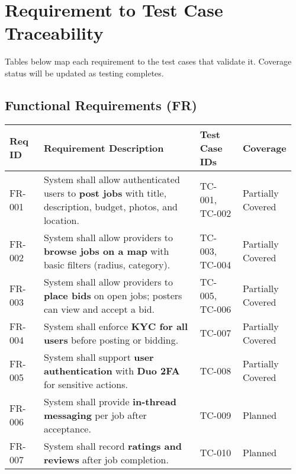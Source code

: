\documentclass[11pt]{article}
\begin{document}
\section{Requirement to Test Case Traceability}
Tables below map each requirement to the test cases that validate it. Coverage status will be updated as testing completes.

\subsection*{Functional Requirements (FR)}
\begin{longtable}{@{}p{0.12\linewidth} p{0.55\linewidth} p{0.15\linewidth} p{0.14\linewidth}@{}}
\toprule
\textbf{Req ID} & \textbf{Requirement Description} & \textbf{Test Case IDs} & \textbf{Coverage} \\
\midrule
\endhead
FR-001 & System shall allow authenticated users to \textbf{post jobs} with title, description, budget, photos, and location. & TC-001, TC-002 & Partially Covered \\
FR-002 & System shall allow providers to \textbf{browse jobs on a map} with basic filters (radius, category). & TC-003, TC-004 & Partially Covered \\
FR-003 & System shall allow providers to \textbf{place bids} on open jobs; posters can view and accept a bid. & TC-005, TC-006 & Partially Covered \\
FR-004 & System shall enforce \textbf{KYC for all users} before posting or bidding. & TC-007 & Partially Covered \\
FR-005 & System shall support \textbf{user authentication} with \textbf{Duo 2FA} for sensitive actions. & TC-008 & Partially Covered \\
FR-006 & System shall provide \textbf{in-thread messaging} per job after acceptance. & TC-009 & Planned \\
FR-007 & System shall record \textbf{ratings and reviews} after job completion. & TC-010 & Planned \\
\bottomrule
\end{longtable}
\end{document}
